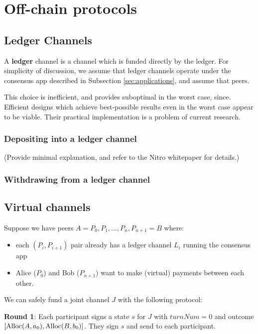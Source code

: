 \section{Off-chain protocols}
\subsection{Ledger Channels}

A \textbf{ledger} channel is a channel which is funded directly by the ledger.
For simplicity of discussion, we assume that ledger channels operate under the consensus app described in Subsection \ref{sec:applications}, and assume that peers.

This choice is inefficient, and provides suboptimal \timeToPayment in the worst case, since. Efficient designs which achieve best-possible results even in the worst case appear to be viable. Their practical implementation is a problem of current research.

\subsubsection{Depositing into a ledger channel}
(Provide minimal explanation, and refer to the Nitro whitepaper for details.)

\subsubsection{Withdrawing from a ledger channel}

\subsection{Virtual channels}\label{sub:virtual-funding}
Suppose we have peers $A = P_0, P_1, ..., P_n, P_{n+1} = B$ where:
\begin{itemize}
    \item each $(P_i, P_{i+1})$ pair already has a ledger channel $L_i$ running the consensus app
    \item Alice ($P_0$) and Bob ($P_{n+1}$) want to make (virtual) payments between each other.
\end{itemize}

We can safely fund a joint channel $J$ with the following protocol:

\textbf{Round 1}: Each participant signs a state $s$ for $J$ with $turnNum = 0$ and outcome $[\mbox{Alloc}(A, a_0), \mbox{Alloc}(B, b_0)]$. They sign $s$ and send to each participant.


